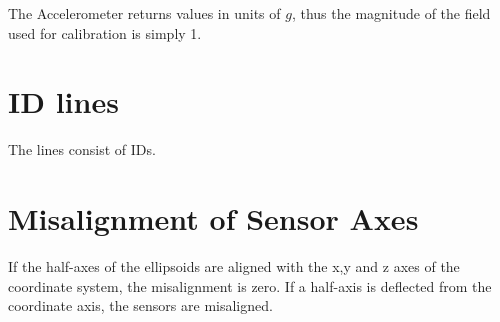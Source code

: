 The Accelerometer returns values in units of $g$, thus the magnitude of the field used for calibration is simply 1.

\section{ID lines \label{sec:da:id_lines}}
The lines consist of IDs.

\section{Misalignment of Sensor Axes \label{sec:da:misalignment}}
If the half-axes of the ellipsoids are aligned with the x,y and z axes of the coordinate system, the misalignment is zero. If a half-axis is deflected from the coordinate axis, the sensors are misaligned.